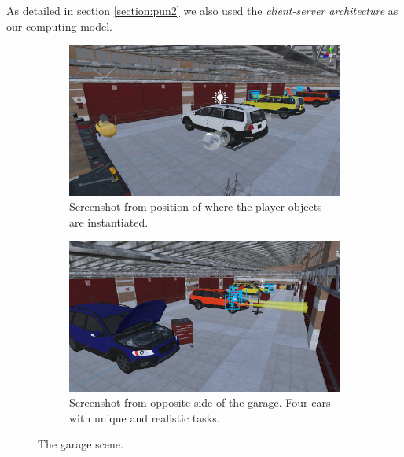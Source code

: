 As detailed in section \ref{section:pun2} we also used the \textit{client-server architecture} as our computing model. 

\begin{figure}[H]
  \centering
  \begin{subfigure}[b]{0.47\textwidth}
    \includegraphics[width=1\textwidth]{fig/phase_2/implementation/workshop1.PNG}
    \caption{Screenshot from position of where the player objects are instantiated.}
    \label{fig:garage1}
  \end{subfigure}
  \hfill%
  \begin{subfigure}[b]{0.47\textwidth}
    \includegraphics[width=1\textwidth]{fig/phase_2/implementation/workshop2.PNG}
    \caption{Screenshot from opposite side of the garage. Four cars with unique and realistic tasks.}
    \label{fig:garage2}
  \end{subfigure}
  \hfill%
  \caption{The garage scene.}
  \label{fig:phase2Garage}
\end{figure}


